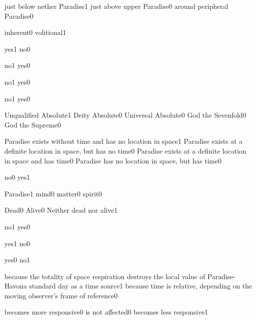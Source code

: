 {just below nether Paradise}{1}
{just above upper Paradise}{0}
{around peripheral Paradise}{0}
\qstop

{inherent}{0}
{volitional}{1}
\qstop

{yes}{1}
{no}{0}
\qstop

{no}{1}
{yes}{0}
\qstop

{no}{1}
{yes}{0}
\qstop

{no}{1}
{yes}{0}
\qstop

{Unqualified Absolute}{1}
{Deity Absolute}{0}
{Universal Absolute}{0}
{God the Sevenfold}{0}
{God the Supreme}{0}
\qstop

{Paradise exists without time and has no location in space}{1}
{Paradise exists at a definite location in space, but has no time}{0}
{Paradise exists at a definite location in space and has time}{0}
{Paradise has no location in space, but has time}{0}
\qstop

{no}{0}
{yes}{1}
\qstop

{Paradise}{1}
{mind}{0}
{matter}{0}
{spirit}{0}
\qstop

{Dead}{0}
{Alive}{0}
{Neither dead nor alive}{1}
\qstop

{no}{1}
{yes}{0}
\qstop

{yes}{1}
{no}{0}
\qstop

{yes}{0}
{no}{1}
\qstop


{because the totality of space respiration destroys the local value of Paradise-Havona standard day as a time source}{1}
{because time is relative, depending on the moving observer's frame of reference}{0}
\qstop

{becomes more responsive}{0}
{is not affected}{0}
{becomes less responsive}{1}
\qstop

